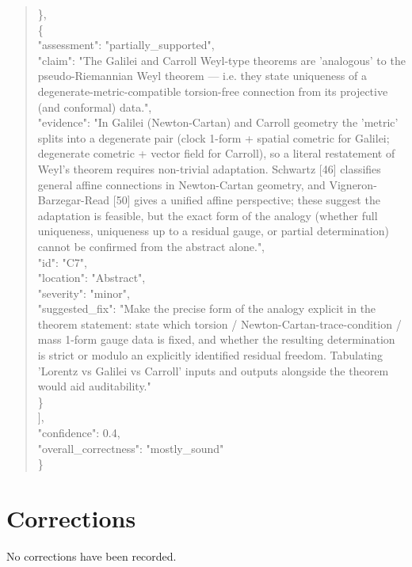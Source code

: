 \documentclass[11pt]{article}
\begin{document}
\begin{quote}
    \},\\
    \{\\
      "assessment": "partially\_supported",\\
      "claim": "The Galilei and Carroll Weyl-type theorems are 'analogous' to the pseudo-Riemannian Weyl theorem — i.e. they state uniqueness of a degenerate-metric-compatible torsion-free connection from its projective (and conformal) data.",\\
      "evidence": "In Galilei (Newton-Cartan) and Carroll geometry the 'metric' splits into a degenerate pair (clock 1-form + spatial cometric for Galilei; degenerate cometric + vector field for Carroll), so a literal restatement of Weyl's theorem requires non-trivial adaptation. Schwartz [46] classifies general affine connections in Newton-Cartan geometry, and Vigneron-Barzegar-Read [50] gives a unified affine perspective; these suggest the adaptation is feasible, but the exact form of the analogy (whether full uniqueness, uniqueness up to a residual gauge, or partial determination) cannot be confirmed from the abstract alone.",\\
      "id": "C7",\\
      "location": "Abstract",\\
      "severity": "minor",\\
      "suggested\_fix": "Make the precise form of the analogy explicit in the theorem statement: state which torsion / Newton-Cartan-trace-condition / mass 1-form gauge data is fixed, and whether the resulting determination is strict or modulo an explicitly identified residual freedom. Tabulating 'Lorentz vs Galilei vs Carroll' inputs and outputs alongside the theorem would aid auditability."\\
    \}\\
  ],\\
  "confidence": 0.4,\\
  "overall\_correctness": "mostly\_sound"\\
\}\\
\end{quote}

\section*{Corrections}
No corrections have been recorded.
\end{document}
